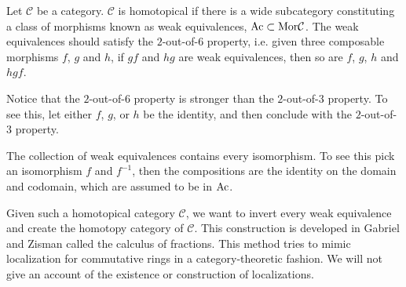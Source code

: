 \documentclass[../thesis.tex]{subfiles}
\begin{document}
            \begin{definition}
                Let $\mathcal{C}$ be a category. $\mathcal{C}$ is homotopical if there is a wide subcategory constituting a class of morphisms known as weak equivalences, $\tt{Ac}\subset \tt{Mor}\mathcal{C}$. The weak equivalences should satisfy the $2$-out-of-$6$ property, i.e. given three composable morphisms $f$, $g$ and $h$, if $gf$ and $hg$ are weak equivalences, then so are $f$, $g$, $h$ and $hgf$.

                \begin{center}
                \end{center}
            \end{definition}

            \begin{remark}
                Notice that the $2$-out-of-$6$ property is stronger than the $2$-out-of-$3$ property. To see this, let either $f$, $g$, or $h$ be the identity, and then conclude with the $2$-out-of-$3$ property.
            \end{remark}

            \begin{remark}
                The collection of weak equivalences contains every isomorphism. To see this pick an isomorphism $f$ and $f^{-1}$, then the compositions are the identity on the domain and codomain, which are assumed to be in $\tt{Ac}$.
            \end{remark}
            
            Given such a homotopical category $\mathcal{C}$, we want to invert every weak equivalence and create the homotopy category of $\mathcal{C}$. This construction is developed in Gabriel and Zisman \cite{Zisman67} called the calculus of fractions. This method tries to mimic localization for commutative rings in a category-theoretic fashion. We will not give an account of the existence or construction of localizations.
\end{document}
